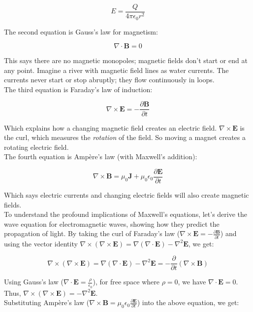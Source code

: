 \documentclass[krantz1,ChapterTOCs]{krantz}
\begin{document}
\[
E = \frac{Q}{4\pi \epsilon_0 r^2}
\]

The second equation is Gauss's law for magnetism:

\[
\nabla \cdot \mathbf{B} = 0
\]

This says there are no magnetic monopoles; magnetic fields don't start or end at any point. Imagine a river with magnetic field lines as water currents. The currents never start or stop abruptly; they flow continuously in loops.\\

The third equation is Faraday's law of induction:

\begin{equation}
\nabla \times \mathbf{E} = -\frac{\partial \mathbf{B}}{\partial t}
\end{equation}

Which explains how a changing magnetic field creates an electric field. $\nabla \times \mathbf{E}$ is the curl, which measures the \textit{rotation} of the field. So moving a magnet creates a rotating electric field.\\

The fourth equation is Ampère's law (with Maxwell's addition):

\[
\nabla \times \mathbf{B} = \mu_0 \mathbf{J} + \mu_0 \epsilon_0 \frac{\partial \mathbf{E}}{\partial t}
\]

Which says electric currents and changing electric fields will also create magnetic fields.\\

To understand the profound implications of Maxwell's equations, let’s derive the wave equation for electromagnetic waves, showing how they predict the propagation of light. By taking the curl of Faraday's law (\(\nabla \times \mathbf{E} = -\frac{\partial \mathbf{B}}{\partial t}\)) and using the vector identity \(\nabla \times (\nabla \times \mathbf{E}) = \nabla (\nabla \cdot \mathbf{E}) - \nabla^2 \mathbf{E}\), we get:

\[
\nabla \times (\nabla \times \mathbf{E}) = \nabla (\nabla \cdot \mathbf{E}) - \nabla^2 \mathbf{E} = -\frac{\partial}{\partial t} (\nabla \times \mathbf{B})
\]

Using Gauss's law (\(\nabla \cdot \mathbf{E} = \frac{\rho}{\epsilon_0}\)), for free space where \(\rho = 0\), we have \(\nabla \cdot \mathbf{E} = 0\). Thus, \(\nabla \times (\nabla \times \mathbf{E}) = -\nabla^2 \mathbf{E}\).\\

Substituting Ampère's law (\(\nabla \times \mathbf{B} = \mu_0 \epsilon_0 \frac{\partial \mathbf{E}}{\partial t}\)) into the above equation, we get:
\end{document}
